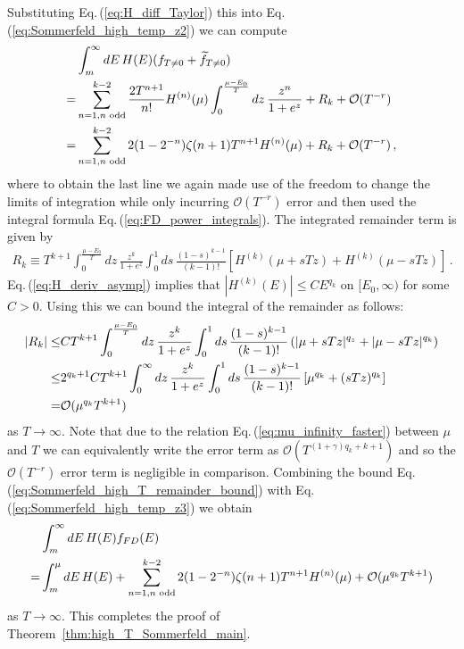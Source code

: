 \documentclass[sn-mathphys,Numbered]{sn-jnl}
\newcommand{\req}[1]{Eq.\,(\ref{#1})}
\newcommand{\rTh}[1]{Theorem~{\ref{#1}}}
\begin{document}
Substituting \req{eq:H_diff_Taylor} this into \req{eq:Sommerfeld_high_temp_z2} we can compute
\begin{align}
 &\int_m^\infty dE\, H(E)(f_{T\neq 0}+\widetilde{f}_{T\neq 0})\notag\\
 =&\sum_{n=1,n\text{ odd}}^{k-2} \frac{2T^{n+1}}{n!}H^{(n)}(\mu)\int_0^{\frac{\mu-E_0}{T}} dz \,\frac{z^n}{1+e^{z}}+R_k
+\mathcal{O}(T^{-r})\notag\\
=&\sum_{n=1,n\text{ odd}}^{k-2} 2(1-2^{-n})\zeta(n+1)T^{n+1}H^{(n)}(\mu)
+R_k
+\mathcal{O}(T^{-r})\,,\label{eq:Sommerfeld_high_temp_z3}
\end{align}
where to obtain the last line we again made use of the freedom to change the limits of integration while only incurring $\mathcal{O}(T^{-r})$ error and then used the integral formula \req{eq:FD_power_integrals}. The integrated remainder term is given by
\begin{align}
 R_k\equiv T^{k+1}\int_0^{\frac{\mu-E_0}{T}} dz \,\frac{z^k}{1+e^{z}}
 \int_0^1 ds\, \frac{(1-s)^{k-1}}{(k-1)!} \left[H^{(k)}(\mu+sTz)+H^{(k)}(\mu-sTz)\right]\,.
\end{align}
\req{eq:H_deriv_asymp} implies that $|H^{(k)}(E)|\leq CE^{q_k}$ on $[E_0,\infty)$ for some $C>0$. Using this we can bound the integral of the remainder as follows:
\begin{align}
 |R_k|\leq &CT^{k+1}\int_0^{\frac{\mu-E_0}{T}} dz \,\frac{z^k}{1+e^{z}}
 \int_0^1 ds\, \frac{(1-s)^{k-1}}{(k-1)!} \left(|\mu+sTz|^{q_z}+|\mu-sTz|^{q_k}\right)\notag\\
 \leq&2^{q_k+1}CT^{k+1}\int_0^{\infty} dz \,\frac{z^k}{1+e^{z}}\notag
 \int_0^1 ds\, \frac{(1-s)^{k-1}}{(k-1)!} \left[\mu^{q_k}+(sTz)^{q_k}\right]\notag\\
 =&\mathcal{O}(\mu^{q_k}T^{k+1})\label{eq:Sommerfeld_high_T_remainder_bound}
\end{align}
as $T\to\infty$. Note that due to the relation \req{eq:mu_infinity_faster} between $\mu$ and $T$ we can equivalently write the error term as $\mathcal{O}(T^{(1+\gamma)q_k+k+1})$ and so the $\mathcal{O}(T^{-r})$ error term is negligible in comparison. Combining the bound \req{eq:Sommerfeld_high_T_remainder_bound} with \req{eq:Sommerfeld_high_temp_z3} we obtain 
\begin{align}
 &\int_m^\infty dE\, H(E)f_{FD}(E)\notag\\
=&\int_m^\mu dE\, H(E)+\sum_{n=1,n\text{ odd}}^{k-2} 2(1-2^{-n})\zeta(n+1)T^{n+1}H^{(n)}(\mu)+\mathcal{O}(\mu^{q_k}T^{k+1})\label{eq:Sommerfeld_high_temp_final}
\end{align}
as $T\to\infty$. This completes the proof of \rTh{thm:high_T_Sommerfeld_main}.
\end{document}
